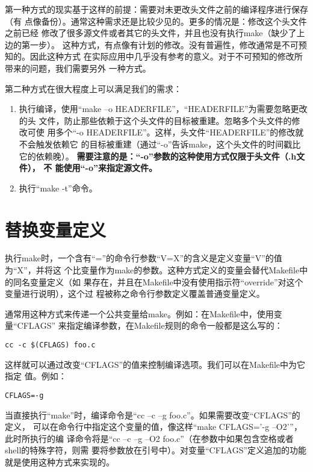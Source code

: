 第一种方式的现实基于这样的前提：需要对未更改头文件之前的编译程序进行保存（有
点像备份）。通常这种需求还是比较少见的。更多的情况是：修改这个头文件之前已经
修改了很多源文件或者其它的头文件，并且也没有执行make（缺少了上边的第一步）。
这种方式，有点像有计划的修改。没有普遍性，修改通常是不可预知的。因此这种方式
在实际应用中几乎没有参考的意义。对于不可预知的修改所带来的问题，我们需要另外
一种方式。

第二种方式在很大程度上可以满足我们的需求：

\begin{enumerate}
\itemsep=4pt \parskip=0pt
  \item 执行编译，使用“make –o HEADERFILE”，“HEADERFILE”为需要忽略更改的头
      文件，防止那些依赖于这个头文件的目标被重建。忽略多个头文件的修改可使
      用多个“-o HEADERFILE”。这样，头文件“HEADERFILE”的修改就不会触发依赖它
      的目标被重建（通过“-o”告诉make，这个头文件的时间戳比它的依赖晚）。%
      \textbf{需要注意的是：“-o”参数的这种使用方式仅限于头文件（.h文件），
  不
      能使用“-o”来指定源文件。}
  \item 执行“make -t”命令。
\end{enumerate}


\section{替换变量定义}
执行make时，一个含有“=”的命令行参数“V=X”的含义是定义变量“V”的值为“X”，并将这
个比变量作为make的参数。这种方式定义的变量会替代Makefile中的同名变量定义（如
果存在，并且在Makefile中没有使用指示符“override”对这个变量进行说明），这个过
程被称之命令行参数定义覆盖普通变量定义。

通常用这种方式来传递一个公共变量给make。例如：在Makefile中，使用变量“CFLAGS”
来指定编译参数，在Makefile规则的命令一般都是这么写的：

\begin{Verbatim}[]
cc -c $(CFLAGS) foo.c
\end{Verbatim}

这样就可以通过改变“CFLAGS”的值来控制编译选项。我们可以在Makefile中为它指定
值。例如：
\begin{Verbatim}[]
CFLAGS=-g
\end{Verbatim}
当直接执行“make”时，编译命令是“cc –c –g foo.c”。如果需要改变“CFLAGS”的定义，
可以在命令行中指定这个变量的值，像这样“make CFLAGS=’-g –O2’”，此时所执行的编
译命令将是“cc –c –g –O2 foo.c”（在参数中如果包含空格或者shell的特殊字符，则需
要将参数放在引号中）。对变量“CFLAGS”定义追加的功能就是使用这种方式来实现的。

